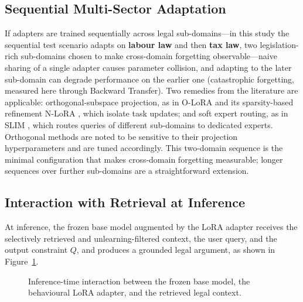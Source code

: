 \subsection{Sequential Multi-Sector Adaptation}
If adapters are trained sequentially across legal sub-domains---in this study the sequential test scenario adapts on \textbf{labour law} and then \textbf{tax law}, two legislation-rich sub-domains chosen to make cross-domain forgetting observable---naive sharing of a single adapter causes parameter collision, and adapting to the later sub-domain can degrade performance on the earlier one (catastrophic forgetting, measured here through Backward Transfer). Two remedies from the literature are applicable: orthogonal-subspace projection, as in O-LoRA \parencite{wang-etal-2023-orthogonal} and its sparsity-based refinement N-LoRA \parencite{yang2024parametercollisionhinderingcontinual}, which isolate task updates; and soft expert routing, as in SLIM \parencite{han-etal-2025-slim}, which routes queries of different sub-domains to dedicated experts. Orthogonal methods are noted to be sensitive to their projection hyperparameters and are tuned accordingly. This two-domain sequence is the minimal configuration that makes cross-domain forgetting measurable; longer sequences over further sub-domains are a straightforward extension.

\subsection{Interaction with Retrieval at Inference}
At inference, the frozen base model augmented by the LoRA adapter receives the selectively retrieved and unlearning-filtered context, the user query, and the output constraint $Q$, and produces a grounded legal argument, as shown in Figure~\ref{fig:lora_inference}.

\begin{figure}[H]
\centering
{}
\caption{Inference-time interaction between the frozen base model, the behavioural LoRA adapter, and the retrieved legal context.}
\label{fig:lora_inference}
\end{figure}

